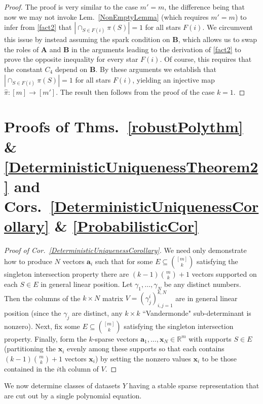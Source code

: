\documentclass[9pt,twocolumn]{pnas-new}
\begin{document}
\begin{proof}
The proof is very similar to the case $m' = m$, the difference being that now we may not invoke Lem.~\ref{NonEmptyLemma} (which requires $m' = m$) to infer from \eqref{fact2} that $| \cap_{S \in F(i)} \pi(S) | = 1$ for all stars $F(i)$. We circumvent this issue by instead assuming the spark condition on $\mathbf{B}$, which allows us to swap the roles of $\mathbf{A}$ and $\mathbf{B}$ in the arguments leading to the derivation of \eqref{fact2} to prove the opposite inequality for every star $F(i)$. Of course, this requires that the constant $C_4$  depend on $\mathbf{B}$. By these arguments we establish that $| \cap_{S \in F(i)} \pi(S) | = 1$ for all stars $F(i)$, yielding an injective map $\hat \pi: [m] \to [m']$. The result then follows from the proof of the case $k=1$. 
\end{proof}

\section{Proofs of Thms.~\ref{robustPolythm} \& \ref{DeterministicUniquenessTheorem2} and Cors.~\ref{DeterministicUniquenessCorollary} \& \ref{ProbabilisticCor}}\label{AppendixB}

\begin{proof}[Proof of Cor.~\ref{DeterministicUniquenessCorollary}]
We need only demonstrate how to produce $N$ vectors $\mathbf{a}_i$ such that for some $E \subseteq {[m] \choose k}$ satisfying the singleton intersection property there are \mbox{$(k-1){m \choose k}+1$} vectors supported on each $S \in E$ in general linear position. Let $\gamma_1, \ldots, \gamma_N$ be any distinct numbers. Then the columns of the $k \times N$ matrix $V = (\gamma^i_j)^{k,N}_{i,j=1}$ are in general linear position (since the $\gamma_j$ are distinct, any $k \times k$ ``Vandermonde" sub-determinant is nonzero). Next, fix some $E \subseteq {[m] \choose k}$ satisfying the singleton intersection property. Finally, form the $k$-sparse vectors $\mathbf{a}_1, \ldots, \mathbf{x}_N \in \mathbb{R}^m$ with supports $S \in E$ (partitioning the $\mathbf{x}_i$ evenly among these supports so that each contains $(k-1){m \choose k}+1$ vectors $\mathbf{x}_i$) by setting the nonzero values $\mathbf{x}_i$ to be those contained in the $i$th column of $V$.
\end{proof}

We now determine classes of datasets $Y$ having a stable sparse representation that are cut out by a single polynomial equation.
\end{document}
